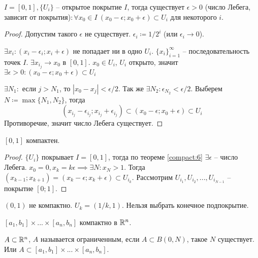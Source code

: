 \documentclass[main]{subfiles}
\begin{document}
\begin{lemma}[Лебега]\label{compact:6}
    $I = [0,1], \{U_i\}$ -- открытое покрытие $I$, тогда существует $\epsilon >0$
    (число Лебега, зависит от покрытия)$: \forall x_0  \in I\ (x_0 - \epsilon; x_0 + \epsilon) \subset U_i$ для некоторого $i$.
\end{lemma}
\begin{proof}
    Допустим такого $\epsilon$ не существует. $\epsilon_i \coloneqq 1/2^i$ (или  $\epsilon_i \to 0$).

    $\exists x_i: (x_i - \epsilon_i; x_i + \epsilon)$ не попадает ни в одно $U_i$.
    $\{x_i\}_{i=1}^{\infty}$ -- последовательность точек $I$.
    $\exists x_{i_j} \to x_0$ в $[0,1]$.
    $x_0 \in U_i$, $U_i$ открыто, значит $\exists \epsilon >0 : (x_0 - \epsilon; x_0 + \epsilon) \subset U_i$

    $\exists N_1:$ если $j > N_1$, то $|x_0 - x_j| < \epsilon/2$.
    Так же $\exists N_2: \epsilon_{N_2} < \epsilon/2$.
    Выберем $N\coloneqq \max\{N_1, N_2\}$, тогда
    \[(x_{i_j} - \epsilon_{i_j}; x_{i_j} + \epsilon_{i_j}) \subset (x_0 - \epsilon; x_0 + \epsilon) \subset U_i\]
    Противоречие, значит число Лебега существует.
\end{proof}

\begin{theorem}\label{compact:7}
    $[0,1]$ компактен.
\end{theorem}
\begin{proof}
    $\{U_i\}$ покрывает $I = [0,1]$, тогда по теореме \ref{compact:6} $\exists \epsilon$ -- число Лебега.
    $x_0 = 0, x_k = k\epsilon \implies \exists N: x_N > 1$.
    Тогда $(x_{k-1}; x_{k+1}) = (x_k - \epsilon; x_k + \epsilon) \subset U_{i_k}$.
    Рассмотрим $U_{i_1}, U_{i_2}, ..., U_{i_{N-1}}$ -- покрытие $[0;1]$.
\end{proof}

\begin{remark}
    $(0,1)$ не компактно. $U_k = (1/k, 1)$. Нельзя выбрать конечное подпокрытие.
\end{remark}
\begin{corollary}\label{compact:7:1}
    $[a_1, b_1] \times ... \times [a_n, b_n]$ компактно в $\mathbb{R}^n$.
\end{corollary}

\begin{definition}
    $A \subset \mathbb{R}^n$, $A$ называется ограниченным, если $A \subset B(0, N)$, такое $N$ существует.
    Или $A \subset [a_1, b_1] \times ... \times [a_n, b_n]$.
\end{definition}
\end{document}
